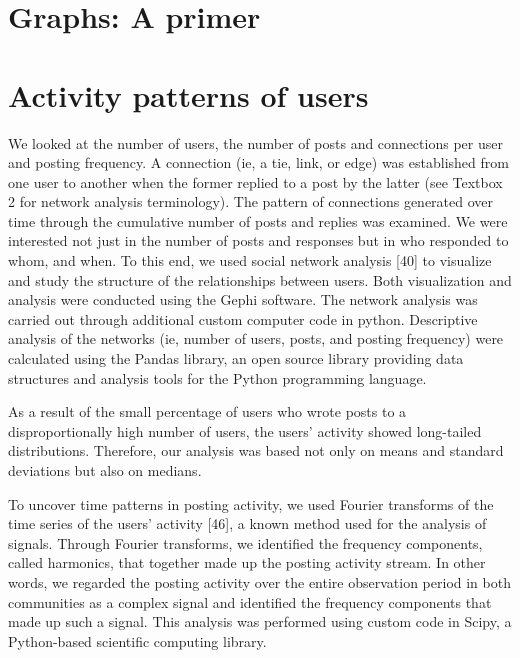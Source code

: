 \section{Graphs: A primer}



\section{Activity patterns of users}

We looked at the number of users, the number of posts and connections per user and posting frequency. A connection (ie, a tie, link, or edge) was established from one user to another when the former replied to a post by the latter (see Textbox 2 for network analysis terminology). The pattern of connections generated over time through the cumulative number of posts and replies was examined. We were interested not just in the number of posts and responses but in who responded to whom, and when. To this end, we used social network analysis [40] to visualize and study the structure of the relationships between users. Both visualization and analysis were conducted using the Gephi software. The network analysis was carried out through additional custom computer code in python. Descriptive analysis of the networks (ie, number of users, posts, and posting frequency) were calculated using the Pandas library, an open source library providing data structures and analysis tools for the Python programming language.

As a result of the small percentage of users who wrote posts to a disproportionally high number of users, the users’ activity showed long-tailed distributions. Therefore, our analysis was based not only on means and standard deviations but also on medians.

To uncover time patterns in posting activity, we used Fourier transforms of the time series of the users’ activity [46], a known method used for the analysis of signals. Through Fourier transforms, we identified the frequency components, called harmonics, that together made up the posting activity stream. In other words, we regarded the posting activity over the entire observation period in both communities as a complex signal and identified the frequency components that made up such a signal. This analysis was performed using custom code in Scipy, a Python-based scientific computing library.

